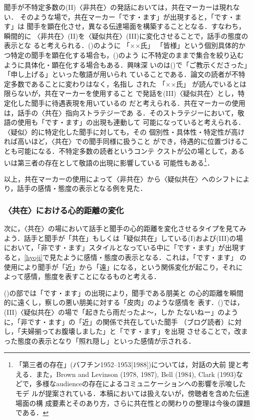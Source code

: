 \documentclass[japanese]{jnlp_1.3c}
\begin{document}
聞手が不特定多数の(II)〈非共在〉の発話においては，共在マーカーは現れない．
そのような場で，共在マーカー「です・ます」が出現すると，「です・ます」は
聞手を顕在化させ，異なる伝達場面を構築することとなる．すなわち，瞬間的に
〈非共在〉(II)を〈疑似共在〉(III)に変化させることで，話手の態度の表示とな
ると考えられる．()のように
「××氏」
「皆様」という個別具体的かつ特定の聞手を顕在化する場合も，()のよう
に不特定のままで集合を絞り込むように具体化・顕在化する場合もある．興味深
いのは()で「ご教示くださった」「申し上げる」といった敬語が用いられ
ていることである．論文の読者が不特定多数であることに変わりはなく，名指し
された
「××氏」
が読んでいるとは限らないが，共在マーカーを使用すること
で発話を(III)〈疑似共在〉とし，特定化した聞手に待遇表現を用いているの
だと考えられる．共在マーカーの使用は，話手の〈共在〉指向ストラテジーであ
る．そのストラテジーにおいて，敬語の使用も「です・ます」の出現も連動して
可能になっていると考えられる．〈疑似〉的に特定化した聞手に対しても，その
個別性・具体性・特定性が高ければ高いほど，〈共在〉での聞手同様に扱うこと
ができ，待遇的に位置づけることも可能になる．不特定多数の読者というコンテ
クストが公の場として，あるいは第三者の存在として敬語の出現に影響している
可能性もある\footnote{
	「第三者の存在」(バフチン1952--1953[1988])については，対話の大前
	提と考える．また，Brown and Levinson (1978, 1987), Bell (1984), Clark (1993)な
	どで，多様なaudienceの存在によるコミュニケーションへの影響を示唆したモデ
	ルが提案されている．本稿においては扱えないが，傍聴者を含めた伝達場面の構
	成要素とそのあり方，さらに共在性との関わりの整理は今後の課題である．}．

以上，共在マーカーの使用によって〈非共在〉から〈疑似共在〉へのシフトによ
り，話手の感情・態度の表示となる例を見た．

\subsubsection{〈共在〉における心的距離の変化}

次に，〈共在〉の場において話手と聞手の心的距離を変化させるタイプを見てみ
よう．話手と聞手が「共在」もしくは「疑似共在」している(I)および(III)の場
において，「非です・ます」スタイルとなっている中に「です・ます」が出現す
ると，\ref{hyoji}で見たように感情・態度の表示となる．これは，「です・ます」
の使用により聞手が「近」から「遠」になる，という関係変化が起こり，それに
よって感情，態度を表すことになるものと考える．

()の\unami{　　}部では「です・ます」の出現により，聞手である朋美と
の心的距離を瞬間的に遠くし，察しの悪い朋美に対する「皮肉」のような感情を
表す．()では，(III)〈疑似共在〉の場で「起きたら雨だったよ〜，しか
たないねー」のように，「非です・ます」の「近」の関係で共在していた聞手
（ブログ読者）に対し，「夫婦揃ってお腹壊しました」と「です・ます」を出現
させることで，改まった態度の表示となり「照れ隠し」といった感情が示される．
\end{document}
